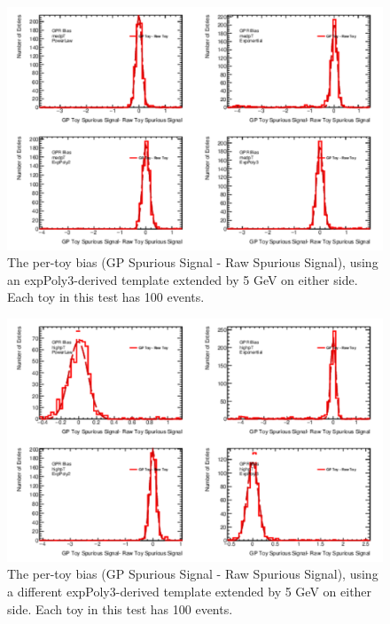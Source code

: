 \begin{figure} 
\begin{center}
  \includegraphics[width=\textwidth]{figures/background/gpr/validation/padded/ToyTest_FitSigBiases_medpT_100_noSig}   
\caption{The per-toy bias (GP Spurious Signal - Raw Spurious Signal), using an expPoly3-derived template extended by 5 GeV on either side. Each toy in this test has 100 events.}
\label{fig:bias_padded_medpt_100_noSig}
\end{center}
\end{figure}

\begin{figure} 
\begin{center}
  \includegraphics[width=\textwidth]{figures/background/gpr/validation/padded/ToyTest_FitSigBiases_highpT_100_noSig}   
\caption{The per-toy bias (GP Spurious Signal - Raw Spurious Signal), using a different expPoly3-derived template extended by 5 GeV on either side. Each toy in this test has 100 events.}
\label{fig:bias_padded_highpt_100_noSig}
\end{center}
\end{figure}

